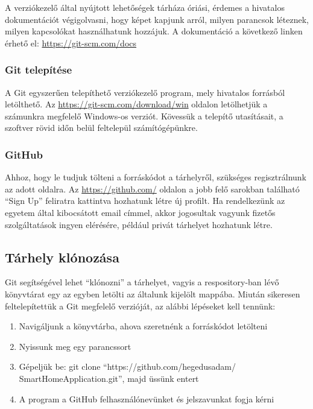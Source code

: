 \documentclass[a4paper,12pt]{report}
\begin{document}
    A verziókezelő által nyújtott lehetőségek tárháza óriási, érdemes a hivatalos dokumentációt végigolvasni, hogy képet kapjunk arról,
    milyen parancsok léteznek, milyen kapcsolókat használhatunk hozzájuk. A dokumentáció a következő linken érhető el: \url{https://git-scm.com/docs}

    \subsubsection{Git telepítése}
    A Git egyszerűen telepíthető verziókezelő program, mely hivatalos forrásból letölthető. Az \url{https://git-scm.com/download/win} oldalon
    letölhetjük a számunkra megfelelő Windows-os verziót. Kövessük a telepítő utasításait, a szoftver rövid időn belül feltelepül számítógépünkre.

    \subsubsection{GitHub}
    Ahhoz, hogy le tudjuk tölteni a forráskódot a tárhelyről, szükséges regisztrálnunk az adott oldalra. Az \url{https://github.com/} oldalon
    a jobb felő sarokban található ``Sign Up'' feliratra kattintva hozhatunk létre új profilt. Ha rendelkezünk az egyetem által kibocsátott
    email címmel, akkor jogosultak vagyunk fizetős szolgáltatások ingyen elérésére, például privát tárhelyet hozhatunk létre.

    \subsection{Tárhely klónozása}
    Git segítségével lehet ``klónozni'' a tárhelyet, vagyis a respository-ban lévő könyvtárat egy az egyben letölti az általunk kijelölt
    mappába. Miután sikeresen feltelepítettük a Git megfelelő verzióját, az alábbi lépéseket kell tennünk:

    \begin{enumerate}
        \item Navigáljunk a könyvtárba, ahova szeretnénk a forráskódot letölteni
        \item Nyissunk meg egy parancssort
        \item Gépeljük be: git clone ``https://github.com/hegedusadam/\\SmartHomeApplication.git'', majd üssünk entert
        \item A program a GitHub felhasználónevünket és jelszavunkat fogja kérni
    \end{enumerate}
\end{document}
